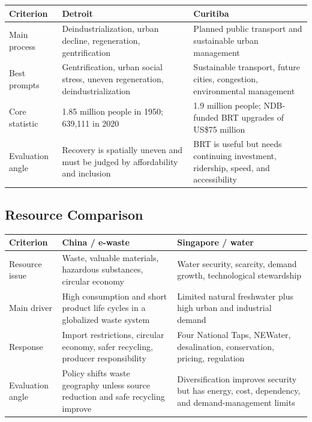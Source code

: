\documentclass[11pt,a4paper]{article}
\begin{document}
\begin{tabularx}{\textwidth}{L{0.18\textwidth}Y Y}
\toprule
\textbf{Criterion} & \textbf{Detroit} & \textbf{Curitiba} \\
\midrule
Main process & Deindustrialization, urban decline, regeneration,
gentrification & Planned public transport and sustainable urban management \\
Best prompts & Gentrification, urban social stress, uneven regeneration,
deindustrialization & Sustainable transport, future cities, congestion,
environmental management \\
Core statistic & 1.85 million people in 1950; 639,111 in 2020 & 1.9 million
people; NDB-funded BRT upgrades of US\$75 million \\
Evaluation angle & Recovery is spatially uneven and must be judged by
affordability and inclusion & BRT is useful but needs continuing investment,
ridership, speed, and accessibility \\
\bottomrule
\end{tabularx}

\subsection{Resource Comparison}

\begin{tabularx}{\textwidth}{L{0.18\textwidth}Y Y}
\toprule
\textbf{Criterion} & \textbf{China / e-waste} & \textbf{Singapore / water} \\
\midrule
Resource issue & Waste, valuable materials, hazardous substances, circular
economy & Water security, scarcity, demand growth, technological stewardship \\
Main driver & High consumption and short product life cycles in a globalized
waste system & Limited natural freshwater plus high urban and industrial demand \\
Response & Import restrictions, circular economy, safer recycling, producer
responsibility & Four National Taps, NEWater, desalination, conservation,
pricing, regulation \\
Evaluation angle & Policy shifts waste geography unless source reduction and
safe recycling improve & Diversification improves security but has energy,
cost, dependency, and demand-management limits \\
\bottomrule
\end{tabularx}
\end{document}
